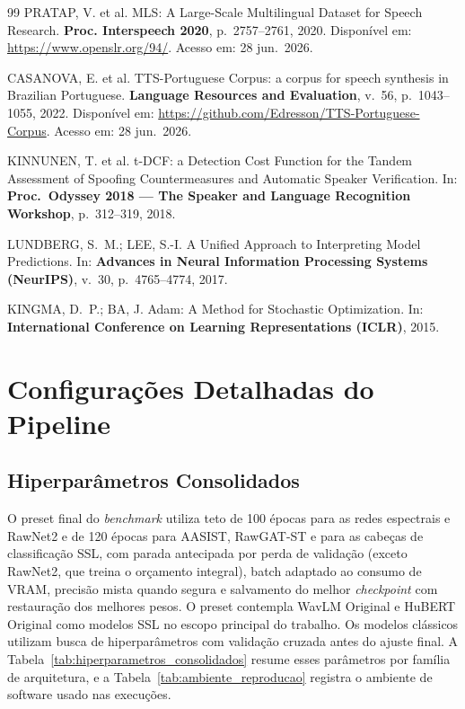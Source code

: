\documentclass[12pt,a4paper]{article}
\begin{document}
\begin{thebibliography}{99}
PRATAP, V. et al.
MLS: A Large-Scale Multilingual Dataset for Speech Research.
\textbf{Proc. Interspeech 2020}, p.~2757--2761, 2020.
Disponível em: \url{https://www.openslr.org/94/}.
Acesso em: 28 jun.\ 2026.

CASANOVA, E. et al.
TTS-Portuguese Corpus: a corpus for speech synthesis in Brazilian Portuguese.
\textbf{Language Resources and Evaluation},
v.~56, p.~1043--1055, 2022.
Disponível em: \url{https://github.com/Edresson/TTS-Portuguese-Corpus}.
Acesso em: 28 jun.\ 2026.

KINNUNEN, T. et al.
t-DCF: a Detection Cost Function for the Tandem Assessment of Spoofing
Countermeasures and Automatic Speaker Verification.
In: \textbf{Proc.\ Odyssey 2018 --- The Speaker and Language Recognition
Workshop}, p.~312--319, 2018.

LUNDBERG, S.~M.; LEE, S.-I.
A Unified Approach to Interpreting Model Predictions.
In: \textbf{Advances in Neural Information Processing Systems (NeurIPS)},
v.~30, p.~4765--4774, 2017.

KINGMA, D.~P.; BA, J.
Adam: A Method for Stochastic Optimization.
In: \textbf{International Conference on Learning Representations (ICLR)},
2015.

\end{thebibliography}

\clearpage
\appendix


\section{Configurações Detalhadas do Pipeline}

\subsection{Hiperparâmetros Consolidados}

O preset final do \textit{benchmark} utiliza teto de 100 épocas para as redes
espectrais e RawNet2 e de 120 épocas para AASIST, RawGAT-ST e para as cabeças
de classificação SSL, com parada antecipada por perda de validação (exceto
RawNet2, que treina o orçamento integral), batch adaptado ao consumo de VRAM,
precisão mista quando segura e salvamento do melhor \textit{checkpoint} com
restauração dos melhores pesos.
O preset contempla WavLM Original e HuBERT Original como modelos SSL no
escopo principal do trabalho. Os modelos clássicos utilizam busca de
hiperparâmetros com validação cruzada antes do ajuste final. A
Tabela~\ref{tab:hiperparametros_consolidados} resume esses parâmetros por
família de arquitetura, e a Tabela~\ref{tab:ambiente_reproducao} registra o
ambiente de software usado nas execuções.
\end{document}

